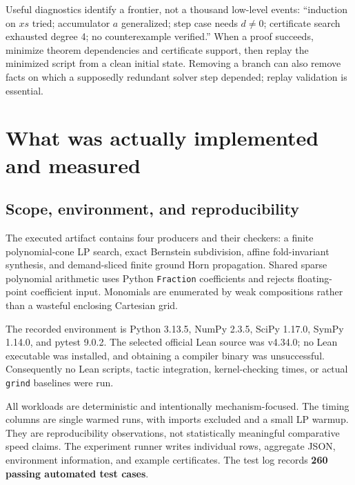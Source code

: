 \documentclass[11pt,a4paper]{article}
\newcommand{\grind}{\texttt{grind}}
\newcommand{\code}[1]{\texttt{#1}}
\begin{document}
Useful diagnostics identify a frontier, not a thousand low-level events: ``induction on $xs$ tried; accumulator $a$ generalized; step case needs $d\ne0$; certificate search exhausted degree 4; no counterexample verified.'' When a proof succeeds, minimize theorem dependencies and certificate support, then replay the minimized script from a clean initial state. Removing a branch can also remove facts on which a supposedly redundant solver step depended; replay validation is essential.

\section{What was actually implemented and measured}\label{sec:experiments}
\subsection{Scope, environment, and reproducibility}
The executed artifact contains four producers and their checkers: a finite polynomial-cone LP search, exact Bernstein subdivision, affine fold-invariant synthesis, and demand-sliced finite ground Horn propagation. Shared sparse polynomial arithmetic uses Python \code{Fraction} coefficients and rejects floating-point coefficient input. Monomials are enumerated by weak compositions rather than a wasteful enclosing Cartesian grid.

The recorded environment is Python 3.13.5, NumPy 2.3.5, SciPy 1.17.0, SymPy 1.14.0, and pytest 9.0.2. The selected official Lean source was v4.34.0; no Lean executable was installed, and obtaining a compiler binary was unsuccessful. Consequently no Lean scripts, tactic integration, kernel-checking times, or actual \grind{} baselines were run.

All workloads are deterministic and intentionally mechanism-focused. The timing columns are single warmed runs, with imports excluded and a small LP warmup. They are reproducibility observations, not statistically meaningful comparative speed claims. The experiment runner writes individual rows, aggregate JSON, environment information, and example certificates. The test log records \textbf{260 passing automated test cases}.
\end{document}
